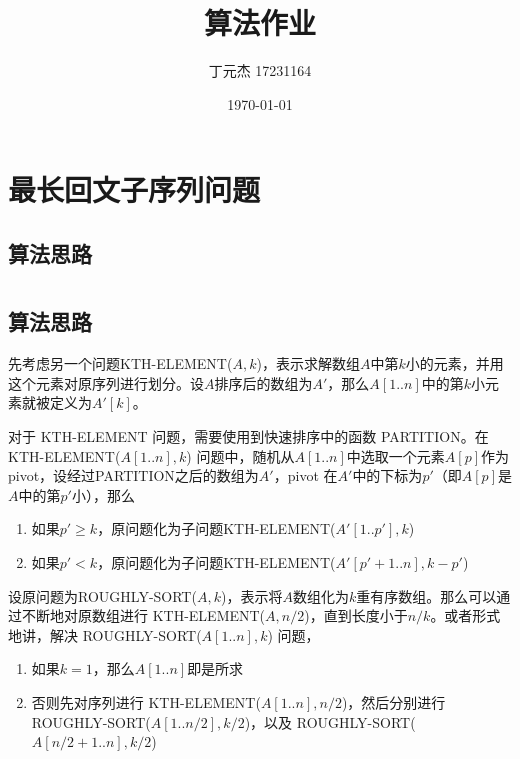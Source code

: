 \documentclass[UTF8]{ctexart}
\title{算法作业}
\author{丁元杰 17231164}
\date{\today}
\begin{document}
\maketitle

\section{最长回文子序列问题}
    \subsection*{算法思路}

    

\section{} %
\subsection*{算法思路}
先考虑另一个问题KTH-ELEMENT($A, k$)，表示求解数组$A$中第$k$小的元素，并用这个元素对原序列进行划分。设$A$排序后的数组为$A'$，那么$A[1..n]$中的第$k$小元素就被定义为$A'[k]$。

对于 KTH-ELEMENT 问题，需要使用到快速排序中的函数 PARTITION。在 KTH-ELEMENT($A[1..n], k$) 问题中，随机从$A[1..n]$中选取一个元素$A[p]$作为 pivot，设经过PARTITION之后的数组为$A'$，pivot 在$A'$中的下标为$p'$（即$A[p]$是$A$中的第$p'$小），那么
\begin{enumerate}
    \item 如果$p' \geq k$，原问题化为子问题KTH-ELEMENT($A'[1..p'], k$)
    \item 如果$p' < k$，原问题化为子问题KTH-ELEMENT($A'[p'+1..n], k-p'$)
\end{enumerate}

设原问题为ROUGHLY-SORT($A, k$)，表示将$A$数组化为$k$重有序数组。那么可以通过不断地对原数组进行 KTH-ELEMENT($A, n/2$)，直到长度小于$n/k$。或者形式地讲，解决 ROUGHLY-SORT($A[1..n], k$) 问题，
\begin{enumerate}
    \item 如果$k = 1$，那么$A[1..n]$即是所求
    \item 否则先对序列进行 KTH-ELEMENT($A[1..n], n/2$)，然后分别进行 ROUGHLY-SORT($A[1..n/2], k/2$)，以及 ROUGHLY-SORT($A[n/2+1..n], k/2$)
\end{enumerate}
\end{document}

